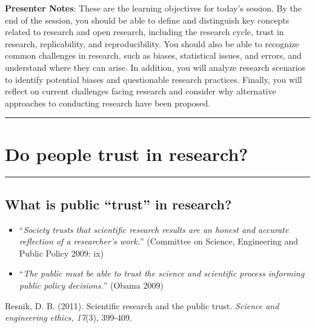 \documentclass[
  english,
  letterpaper,
  DIV=11,
  numbers=noendperiod]{scrartcl}
\begin{document}
\textbf{Presenter Notes}: These are the learning objectives for today's
session. By the end of the session, you should be able to define and
distinguish key concepts related to research and open research,
including the research cycle, trust in research, replicability, and
reproducibility. You should also be able to recognize common challenges
in research, such as biases, statistical issues, and errors, and
understand where they can arise. In addition, you will analyze research
scenarios to identify potential biases and questionable research
practices. Finally, you will reflect on current challenges facing
research and consider why alternative approaches to conducting research
have been proposed.

\begin{center}\rule{0.5\linewidth}{0.5pt}\end{center}

\section{Do people trust in
research?}\label{do-people-trust-in-research}

\begin{center}\rule{0.5\linewidth}{0.5pt}\end{center}

\subsection{What is public ``trust'' in
research?}\label{what-is-public-trust-in-research}

\begin{itemize}
\item
  ``\emph{Society trusts that scientific research results are an honest
  and accurate reflection of a researcher's work.}'' {(Committee on
  Science, Engineering and Public Policy 2009: ix)}
\item
  ``\emph{The public must be able to trust the science and scientific
  process informing public policy decisions.}'' {(Obama 2009)}
\end{itemize}

Resnik, D. B. (2011). Scientific research and the public trust.
\emph{Science and engineering ethics, 17}(3), 399-409.
\end{document}
